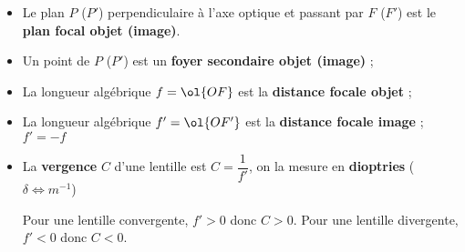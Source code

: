 \documentclass{cours}
\begin{document}
\begin{itemize}
\begin{center}
\end{center}

\item Le plan $P$ ($P'$) perpendiculaire à l'axe optique et passant par $F$ ($F'$) est le \textbf{plan focal objet (image)}.

\item Un point de $P$ ($P'$) est un \textbf{foyer secondaire objet (image)} ;

\item La longueur algébrique $f=\ol{OF}$ est la \textbf{distance focale objet} ;
\item La longueur algébrique $f'=\ol{OF'}$ est la \textbf{distance focale image} ; $f'=-f$

\item La \textbf{vergence} $C$ d'une lentille est $C=\dfrac{1}{f'}$, on la mesure en \textbf{dioptries} ($\delta \Leftrightarrow \si{m^{-1}}$)

Pour une lentille convergente, $f'>0$ donc $C>0$. Pour une lentille divergente, $f'<0$ donc $C<0$. 
\end{itemize}
\end{document}
